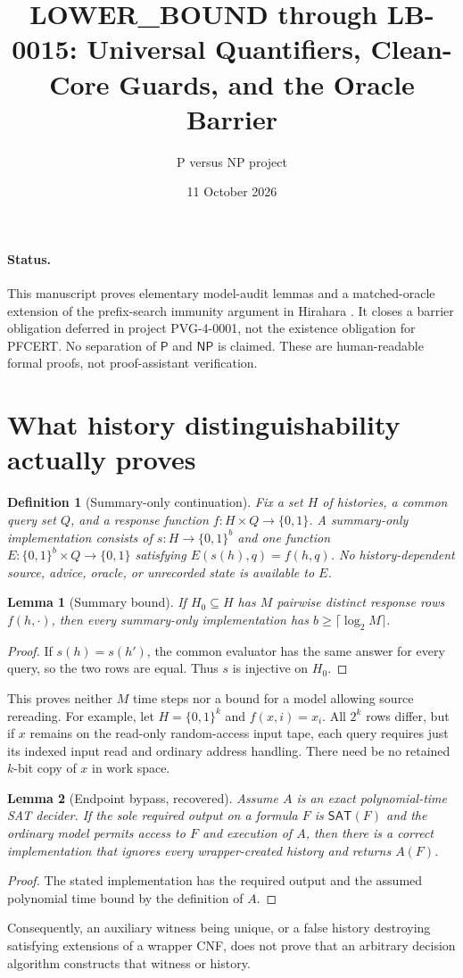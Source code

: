 \documentclass[11pt]{article}
\title{LOWER\_BOUND through LB-0015: Universal Quantifiers, Clean-Core Guards, and the Oracle Barrier}
\author{P versus NP project}
\date{11 October 2026}
\newtheorem{definition}{Definition}
\newtheorem{lemma}{Lemma}
\newcommand{\SAT}{\mathsf{SAT}}
\newcommand{\PP}{\mathsf P}
\newcommand{\NP}{\mathsf{NP}}
\begin{document}
\maketitle
\paragraph{Status.}
This manuscript proves elementary model-audit lemmas and a matched-oracle
extension of the prefix-search immunity argument in Hirahara
\cite{hirahara2020}. It closes a barrier obligation deferred in project
PVG-4-0001, not the existence obligation for PFCERT. No separation of
$\PP$ and $\NP$ is claimed. These are human-readable formal proofs,
not proof-assistant verification.

\section{What history distinguishability actually proves}
\begin{definition}[Summary-only continuation]
Fix a set $H$ of histories, a common query set $Q$, and a response function
$f:H\times Q\to\{0,1\}$. A summary-only implementation consists of
$s:H\to\{0,1\}^{b}$ and one function
$E:\{0,1\}^{b}\times Q\to\{0,1\}$ satisfying
$E(s(h),q)=f(h,q)$. No history-dependent source, advice, oracle, or
unrecorded state is available to $E$.
\end{definition}
\begin{lemma}[Summary bound]
If $H_0\subseteq H$ has $M$ pairwise distinct response rows
$f(h,\cdot)$, then every summary-only implementation has
$b\ge\lceil\log_2M\rceil$.
\end{lemma}
\begin{proof}
If $s(h)=s(h')$, the common evaluator has the same answer for every
query, so the two rows are equal. Thus $s$ is injective on $H_0$.
\end{proof}
This proves neither $M$ time steps nor a bound for a model allowing
source rereading. For example, let $H=\{0,1\}^{k}$ and
$f(x,i)=x_i$. All $2^k$ rows differ, but if $x$ remains on the read-only
random-access input tape, each query requires just its indexed input
read and ordinary address handling. There need be no retained $k$-bit
copy of $x$ in work space.

\begin{lemma}[Endpoint bypass, recovered]
Assume $A$ is an exact polynomial-time SAT decider. If the sole required
output on a formula $F$ is $\SAT(F)$ and the ordinary model permits
access to $F$ and execution of $A$, then there is a correct implementation
that ignores every wrapper-created history and returns $A(F)$.
\end{lemma}
\begin{proof}
The stated implementation has the required output and the assumed
polynomial time bound by the definition of $A$.
\end{proof}
Consequently, an auxiliary witness being unique, or a false history
destroying satisfying extensions of a wrapper CNF, does not prove that
an arbitrary decision algorithm constructs that witness or history.
\end{document}
